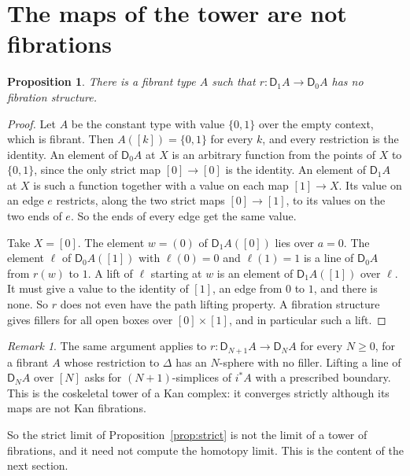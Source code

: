\documentclass[11pt]{article}
\newcommand{\D}{\mathsf{D}}
\theoremstyle{plain}
\newtheorem{proposition}[theorem]{Proposition}
\theoremstyle{definition}
\theoremstyle{remark}
\newtheorem{remark}[theorem]{Remark}
\begin{document}
\section{The maps of the tower are not fibrations}\label{sec:notfib}

\begin{proposition}\label{prop:notfib}
There is a fibrant type $A$ such that $r:\D_1A\to\D_0A$ has no fibration
structure.
\end{proposition}

\begin{proof}
Let $A$ be the constant type with value $\{0,1\}$ over the empty context,
which is fibrant. Then $A([k])=\{0,1\}$ for every $k$, and every
restriction is the identity. An element of $\D_0A$ at $X$ is an arbitrary
function from the points of $X$ to $\{0,1\}$, since the only strict map
$[0]\to[0]$ is the identity. An element of $\D_1A$ at $X$ is such a
function together with a value on each map $[1]\to X$. Its value on an
edge $e$ restricts, along the two strict maps $[0]\to[1]$, to its values on
the two ends of $e$. So the ends of every edge get the same value.

Take $X=[0]$. The element $w=(0)$ of $\D_1A([0])$ lies over $a=0$. The
element $\ell$ of $\D_0A([1])$ with $\ell(0)=0$ and $\ell(1)=1$ is a line
of $\D_0A$ from $r(w)$ to $1$. A lift of $\ell$ starting at $w$ is an
element of $\D_1A([1])$ over $\ell$. It must give a value to the identity
of $[1]$, an edge from $0$ to $1$, and there is none. So $r$ does not even
have the path lifting property. A fibration structure gives fillers for
all open boxes over $[0]\times[1]$, and in particular such a lift.
\end{proof}

\begin{remark}
The same argument applies to $r:\D_{N+1}A\to\D_NA$ for every $N\ge0$, for a
fibrant $A$ whose restriction to $\Delta$ has an $N$-sphere with no
filler. Lifting a line of $\D_NA$ over $[N]$ asks for $(N+1)$-simplices of
$i^*A$ with a prescribed boundary. This is the coskeletal tower of a Kan
complex: it converges strictly although its maps are not Kan fibrations.
\end{remark}

So the strict limit of Proposition~\ref{prop:strict} is not the limit of a
tower of fibrations, and it need not compute the homotopy limit. This is
the content of the next section.

\end{document}
